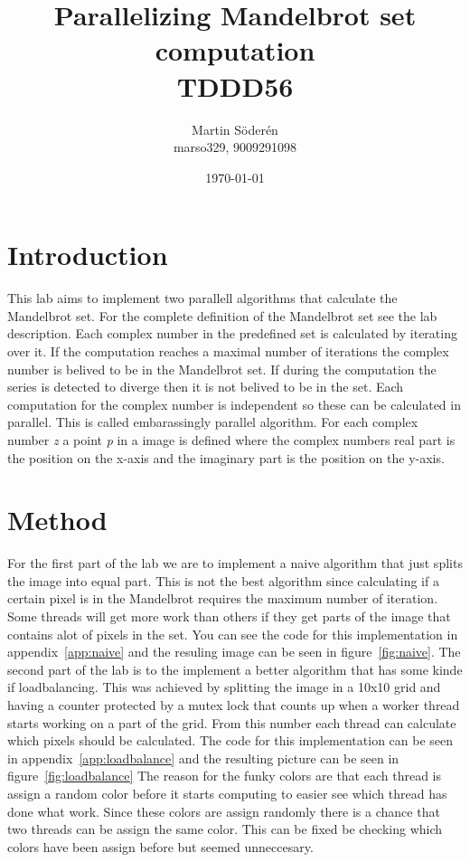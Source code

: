 \documentclass[10pt,twocolumn]{article}
\title{Parallelizing Mandelbrot set computation\\ TDDD56 }
\author{Martin Söderén \\ marso329, 9009291098 }
\date{\today}
\begin{document}
\maketitle

\clearpage

\section{Introduction}
This lab aims to implement two parallell algorithms that calculate the Mandelbrot set. For the complete definition of the Mandelbrot set see the lab description. Each complex number in the predefined set is calculated by iterating over it. If the computation reaches a maximal number of iterations the complex number is belived to be in the Mandelbrot set. If during the computation the series is detected to diverge then it is not belived to be in the set. 
\newline
\newline
Each computation for the complex number is independent so these can be calculated in parallel. This is called embarassingly parallel algorithm. For each complex number \textit{z} a point \textit{p} in a image is defined where the complex numbers real part is the position on the x-axis and the imaginary part is the position on the y-axis.  

\section{Method}
For the first part of the lab we are to implement a naive algorithm that just splits the image into equal part. This is not the best algorithm since calculating if a certain pixel is in the Mandelbrot requires the maximum number of iteration. Some threads will get more work than others if they get parts of the image that contains alot of pixels in the set. You can see the code for this implementation in appendix~\ref{app:naive} and the resuling image can be seen in figure~\ref{fig:naive}.
\newline
\newline
The second part of the lab is to the implement a better algorithm that has some kinde if loadbalancing. This was achieved by splitting the image in a 10x10 grid and having a counter protected by a mutex lock that counts up when a worker thread starts working on a part of the grid. From this number each thread can calculate which pixels should be calculated.  The code for this implementation can be seen in appendix~\ref{app:loadbalance} and the resulting picture can be seen in figure~\ref{fig:loadbalance}
\newline
\newline
The reason for the funky colors are that each thread is assign a random color before it starts computing to easier see which thread has done what work. Since these colors are assign randomly there is a chance that two threads can be assign the same color. This can be fixed be checking which colors have been assign before but seemed unneccesary.
\end{document}
